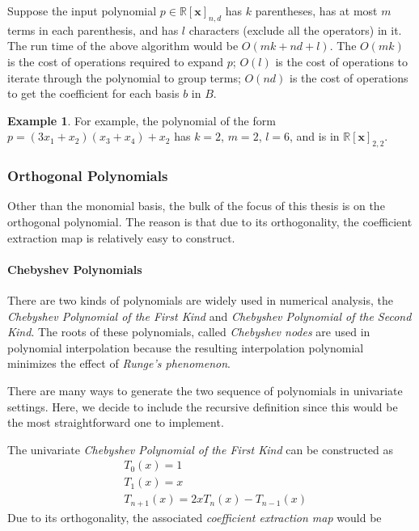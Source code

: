 \documentclass[12pt]{amsart}
\numberwithin{equation}{section}
\theoremstyle{definition}
\newtheorem{example}[thm]{Example}
\numberwithin{thm}{section}
\begin{document}
Suppose the input polynomial $p \in \mathbb{R}[\mathbf{x}]_{n, d}$ has $k$ parentheses, has at most $m$ terms in each parenthesis,
and has $l$ characters (exclude all the operators) in it. 
The run time of the above algorithm would be $O(mk + nd + l)$.
The $O(mk)$ is the cost of operations required to expand $p$;
$O(l)$ is the cost of operations to iterate through the polynomial to group terms;
$O(nd)$ is the cost of operations to get the coefficient for each basis $b$ in $B$.

\begin{example}
     For example, the polynomial of the form $p = (3x_1 + x_2) (x_3 + x_4) + x_2$ has $k = 2$, $m = 2$, $l = 6$, and is in $\mathbb{R}[\mathbf{x}]_{2, 2}$.
\end{example}

\subsubsection{Orthogonal Polynomials}
Other than the monomial basis, the bulk of the focus of this thesis is on the orthogonal polynomial.
The reason is that due to its orthogonality, the coefficient extraction map is relatively easy to construct. 

\paragraph{Chebyshev Polynomials}
There are two kinds of polynomials are widely used in numerical analysis,
the \emph{Chebyshev Polynomial of the First Kind} and \emph{Chebyshev Polynomial of the Second Kind}.
The roots of these polynomials, called \emph{Chebyshev nodes} 
are used in polynomial interpolation because 
the resulting interpolation polynomial minimizes the effect of \emph{Runge's phenomenon}.\cite{Mathews2004Numerical}

There are many ways to generate the two sequence of polynomials in univariate settings. 
Here, we decide to include the recursive definition since this would be the most straightforward one to implement.

The univariate \emph{Chebyshev Polynomial of the First Kind} can be constructed as
\begin{align*} 
     &T_0(x) = 1 \\ 
     &T_1(x) = x \\
     &T_{n+1}(x) = 2x T_n(x) - T_{n-1}(x)
\end{align*}
Due to its orthogonality, the associated \emph{coefficient extraction map} would be 
\end{document}
